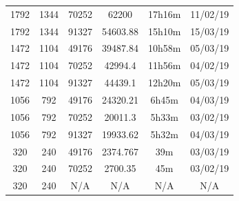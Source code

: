 \documentclass[11pt,a4paper]{report}
\begin{document}
\begin{itemize}
\begin{center}
\begin{tabular}{ c c c | c c c }
  1792 & 1344 & 70252 & 62200 & 17h16m & 11/02/19 \\
  1792 & 1344 & 91327 & 54603.88 & 15h10m & 15/03/19 \\
  1472 & 1104 & 49176 & 39487.84 & 10h58m & 05/03/19 \\
  1472 & 1104 & 70252 & 42994.4 & 11h56m & 04/02/19 \\
  1472 & 1104 & 91327 & 44439.1 & 12h20m & 05/03/19 \\
  1056 & 792 & 49176 & 24320.21 & 6h45m & 04/03/19 \\
  1056 & 792 & 70252 & 20011.3 & 5h33m & 03/02/19 \\
  1056 & 792 & 91327 & 19933.62 & 5h32m & 04/03/19 \\
  320 & 240 & 49176 & 2374.767 & 39m & 03/03/19 \\
  320 & 240 & 70252 & 2700.35 & 45m & 03/02/19 \\
  320 & 240 & N/A & N/A & N/A & N/A \\
  \end{tabular}
  \end{center}
  

\end{itemize}
\end{document}
